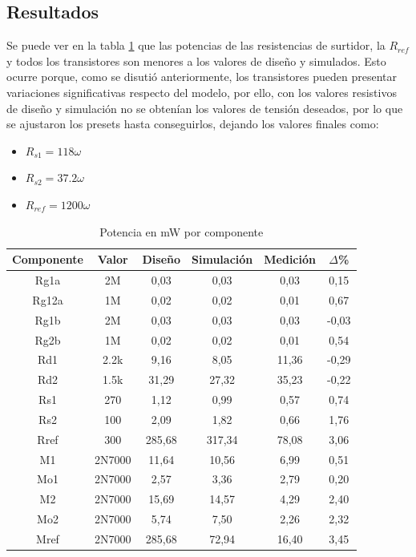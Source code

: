 \subsection{Resultados}

Se puede ver en la tabla \ref{tab:potencia_mW} que las potencias de las resistencias de surtidor, la $R_{ref}$ y todos los transistores son menores a los valores de diseño y simulados. Esto ocurre porque, como se disutió anteriormente, los transistores pueden presentar variaciones significativas respecto del modelo, por ello, con los valores resistivos de diseño y simulación no se obtenían los valores de tensión deseados, por lo que se ajustaron los presets hasta conseguirlos, dejando los valores finales como:

\begin{itemize}
  \item $R_{s1} = 118 \omega$
  \item $R_{s2} = 37.2 \omega$
  \item $R_{ref} = 1200 \omega$
\end{itemize}

\begin{table}[H]
\centering
\begin{tabular}{|c|c|c|c|c|c|}
\hline
\textbf{Componente} & \textbf{Valor} & \textbf{Diseño} & \textbf{Simulación} & \textbf{Medición} & \textbf{$\Delta$\%} \\ \hline
Rg1a & 2M & 0,03 & 0,03 & 0,03 & 0,15 \\ \hline
Rg12a & 1M & 0,02 & 0,02 & 0,01 & 0,67 \\ \hline
Rg1b & 2M & 0,03 & 0,03 & 0,03 & -0,03 \\ \hline
Rg2b & 1M & 0,02 & 0,02 & 0,01 & 0,54 \\ \hline
Rd1 & 2.2k & 9,16 & 8,05 & 11,36 & -0,29 \\ \hline
Rd2 & 1.5k & 31,29 & 27,32 & 35,23 & -0,22 \\ \hline
Rs1 & 270 & 1,12 & 0,99 & 0,57 & 0,74 \\ \hline
Rs2 & 100 & 2,09 & 1,82 & 0,66 & 1,76 \\ \hline
Rref & 300 & 285,68 & 317,34 & 78,08 & 3,06 \\ \hline
M1 & 2N7000 & 11,64 & 10,56 & 6,99 & 0,51 \\ \hline
Mo1 & 2N7000 & 2,57 & 3,36 & 2,79 & 0,20 \\ \hline
M2 & 2N7000 & 15,69 & 14,57 & 4,29 & 2,40 \\ \hline
Mo2 & 2N7000 & 5,74 & 7,50 & 2,26 & 2,32 \\ \hline
Mref & 2N7000 & 285,68 & 72,94 & 16,40 & 3,45 \\ \hline
\end{tabular}
\caption{Potencia en mW por componente}
\label{tab:potencia_mW}
\end{table}

